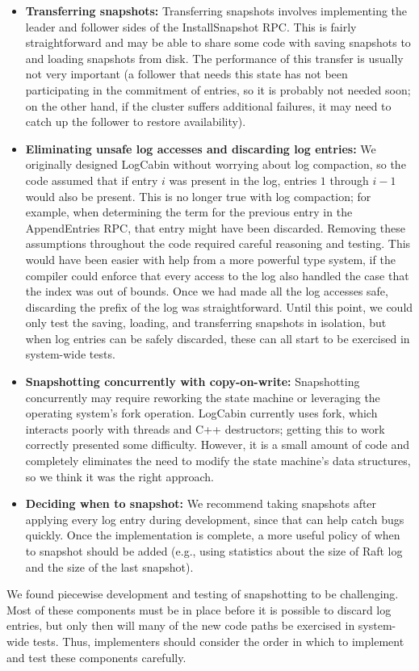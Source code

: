 \begin{itemize}
%
\item \textbf{Transferring snapshots:}
%
Transferring snapshots involves implementing the leader and follower
sides of the InstallSnapshot RPC. This is fairly straightforward and may
be able to share some code with saving snapshots to and loading
snapshots from disk.
The performance of this transfer is usually not very important (a
follower that needs this state has not been participating in the
commitment of entries, so it is probably not needed soon; on the other
hand, if the cluster suffers additional failures,
it may need to catch up the follower to restore availability).
%
\item \textbf{Eliminating unsafe log accesses and discarding log
entries:}
%
We originally designed LogCabin without worrying about
log compaction, so the code assumed that if entry $i$ was present in the
log, entries $1$ through $i - 1$ would also be present. This is no
longer true with log compaction; for example, when determining the term
for the previous entry in the AppendEntries RPC, that entry might have
been discarded.
Removing these assumptions throughout the code required careful
reasoning and testing. This would have been easier with help from a more
powerful type system, if the compiler could enforce that every access to
the log also handled the case that the index was out of bounds.
Once we had made all the log accesses safe, discarding the prefix of
the log was straightforward. Until this point, we could only test the
saving, loading, and transferring snapshots in isolation, but when log entries can be safely
discarded, these can all start to be exercised in
system-wide tests.
%
\item \textbf{Snapshotting concurrently with copy-on-write:}
%
Snapshotting concurrently may require reworking the state machine or
leveraging the operating system's fork operation. LogCabin currently
uses fork, which interacts poorly with threads and C++
destructors; getting this to work correctly presented some
difficulty. However, it is a small amount of code and completely
eliminates the need to modify the state machine's data structures, so we
think it was the right approach.
%
\item \textbf{Deciding when to snapshot:}
%
We recommend taking snapshots after applying every log entry during
development, since that can help catch bugs quickly. Once the
implementation is complete, a more useful policy of when to snapshot
should be added (e.g., using statistics about the size of Raft log and the
size of the last snapshot).
%
\end{itemize}

We found piecewise development and testing of snapshotting to be
challenging. Most of these components must be in place before it is
possible to discard log entries, but only then will many of the new code
paths be exercised in system-wide tests. Thus, implementers should
consider the order in which to implement and test these components carefully.
